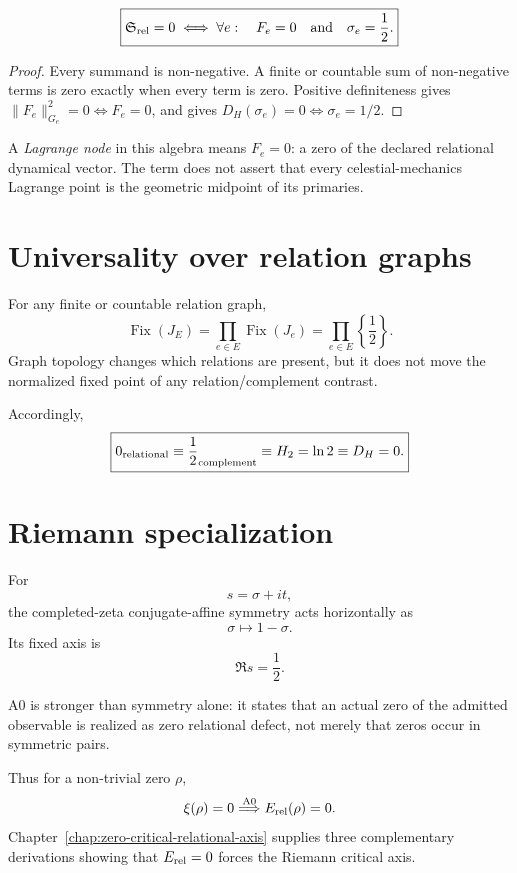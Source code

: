 \begin{theorem}
\label{thm:rz-lagrange}
\[
\boxed{
\mathfrak S_{\rm rel}=0
\iff
\forall e:\quad
F_e=0
\quad\text{and}\quad
\sigma_e=\frac12.
}
\]
\end{theorem}

\begin{proof}
Every summand is non-negative.  A finite or countable sum of non-negative
terms is zero exactly when every term is zero.  Positive definiteness gives
\(\|F_e\|_{G_e}^2=0\iff F_e=0\), and
 gives
\(D_H(\sigma_e)=0\iff\sigma_e=1/2\).
\end{proof}

A \emph{Lagrange node} in this algebra means \(F_e=0\): a zero of the declared
relational dynamical vector.  The term does not assert that every
celestial-mechanics Lagrange point is the geometric midpoint of its primaries.

\section{Universality over relation graphs}

For any finite or countable relation graph,
\[
\operatorname{Fix}(J_E)
=
\prod_{e\in E}
\operatorname{Fix}(J_e)
=
\prod_{e\in E}\left\{\frac12\right\}.
\]
Graph topology changes which relations are present, but it does not move the
normalized fixed point of any relation/complement contrast.

Accordingly,
\[
\boxed{
0_{\rm relational}
\equiv
\frac12_{\rm complement}
\equiv
H_2=\ln2
\equiv
D_H=0.
}
\]

\section{Riemann specialization}

For
\[
s=\sigma+it,
\]
the completed-zeta conjugate-affine symmetry acts horizontally as
\[
\sigma\longmapsto1-\sigma.
\]
Its fixed axis is
\[
\Re s=\frac12.
\]

A0 is stronger than symmetry alone: it states that an actual zero of the
admitted observable is realized as zero relational defect, not merely that
zeros occur in symmetric pairs.

Thus for a non-trivial zero \(\rho\),
\[
\xi(\rho)=0
\stackrel{\mathrm{A0}}{\Longrightarrow}
E_{\rm rel}(\rho)=0.
\]
Chapter~\ref{chap:zero-critical-relational-axis} supplies three complementary
derivations showing that \(E_{\rm rel}=0\) forces the Riemann critical axis.

